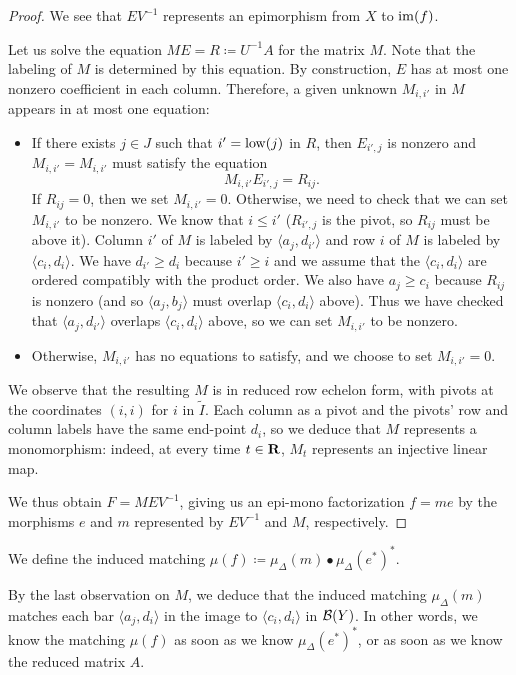 \begin{proof}
  We see that $E V^{-1}$ represents an epimorphism from $X$ to $\operatorname{im}(f)$.

  Let us solve the equation $M E = R \coloneq U^{-1} A$ for the matrix $M$. Note that the labeling of $M$ is determined by this equation. By construction, $E$ has at most one nonzero coefficient in each column. Therefore, a given unknown $M_{i, i'}$ in $M$ appears in at most one equation:
  \begin{itemize}
    \item If there exists $j \in J$ such that $i' = \operatorname{low}(j)$ in $R$, then $E_{i', j}$ is nonzero and $M_{i, i'} = M_{i, i'}$ must satisfy the equation
    \[
      M_{i, i'} E_{i', j} = R_{ij}.
    \]
    If $R_{ij} = 0$, then we set $M_{i, i'} = 0$. Otherwise, we need to check that we can set $M_{i, i'}$ to be nonzero. We know that $i \leq i'$ ($R_{i', j}$ is the pivot, so $R_{ij}$ must be above it). Column $i'$ of $M$ is labeled by $\langle a_j, d_{i'} \rangle$ and row $i$ of $M$ is labeled by $\langle c_i, d_i \rangle$. We have $d_{i'} \geq d_i$ because $i' \geq i$ and we assume that the $\langle c_i, d_i \rangle$ are ordered compatibly with the product order. We also have $a_j \geq c_i$ because $R_{ij}$ is nonzero (and so $\langle a_j, b_j \rangle$ must overlap $\langle c_i, d_i \rangle$ above). Thus we have checked that $\langle a_j, d_{i'} \rangle$ overlaps $\langle c_i, d_i \rangle$ above, so we can set $M_{i, i'}$ to be nonzero.
    \item Otherwise, $M_{i, i'}$ has no equations to satisfy, and we choose to set $M_{i, i'} = 0$.
  \end{itemize}
  We observe that the resulting $M$ is in reduced row echelon form, with pivots at the coordinates $(i, i)$ for $i$ in $\tilde{I}$. Each column as a pivot and the pivots' row and column labels have the same end-point $d_i$, so we deduce that $M$ represents a monomorphism: indeed, at every time $t \in \mathbf{R}$, $M_t$ represents an injective linear map.

  We thus obtain $F = M E V^{-1}$, giving us an epi-mono factorization $f = m e$ by the morphisms $e$ and $m$ represented by $E V^{-1}$ and $M$, respectively.
\end{proof}

\begin{definition}
  We define the induced matching $\mu(f) \coloneq \mu_\Delta(m) \bullet \mu_\Delta(e^*)^*$.
\end{definition}

\begin{remark}
\label{C!R:knowing-epi-suffices}
  By the last observation on $M$, we deduce that the induced matching $\mu_\Delta(m)$ matches each bar $\langle a_j, d_i \rangle$ in the image to $\langle c_i, d_i \rangle$ in $\mathcal{B}(Y)$. In other words, we know the matching $\mu(f)$ as soon as we know $\mu_\Delta(e^*)^*$, or as soon as we know the reduced matrix $A$.
\end{remark}

